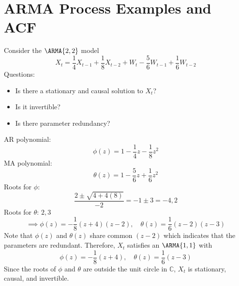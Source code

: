 \section{ARMA Process Examples and ACF}
\begin{Example}{}{}
    Consider the $ \ARMA{2,2} $ model
    \[ X_t= \frac{1}{4}X_{t-1} + \frac{1}{8} X_{t-2} + W_t - \frac{5}{6}W_{t-1} +\frac{1}{6}W_{t-2} \]
    Questions:
    {\color{blue}
    \begin{itemize}
        \item Is there a stationary and causal solution to $X_t$?
        \item Is it invertible?
        \item Is there parameter redundancy?
    \end{itemize}}
    AR polynomial:
    \[ \phi(z)=1-\frac{1}{4}z- \frac{1}{8}z^2  \]
    MA polynomial:
    \[ \theta(z)= 1-\frac{5}{6}z + \frac{1}{6}z^2\]
    Roots for $\phi$:
    \[ \frac{2 \pm \sqrt{4+ 4(8)}}{-2} =-1 \pm 3=-4,2 \]
    Roots for $\theta$: $ 2,3 $
    \[ \implies \phi(z)= -\frac{1}{8}(z+4)(z-2), \quad  \theta(z) = \frac{1}{6}(z-2)(z-3)\]
    Note that $\phi (z)$ and $\theta (z)$ share common $(z-2)$ which indicates
    that the parameters are redundant.
    Therefore, $X_t$ satisfies an $ \ARMA{1,1} $ with
    \[\phi(z)=-\frac{1}{8}(z+4), \quad \theta(z)= \frac{1}{6}(z-3)\]
    Since the roots of $\phi$ and $\theta$ are
    outside the unit circle in $\mathbb{C}$, $X_t$ is
    stationary, causal, and invertible.
\end{Example}
